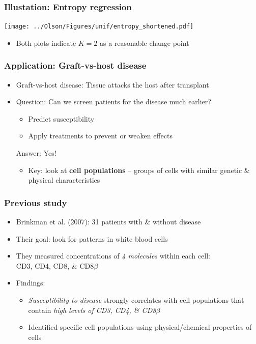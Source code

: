 \documentclass[mathserif,compress]{beamer}
\renewcommand\;{\,}
\begin{document}
\begin{frame}\frametitle{Illustation: Entropy regression}
\begin{center}
\texttt{[image: ../Olson/Figures/unif/entropy\_shortened.pdf]}
\end{center}
\begin{itemize}
\item
Both plots indicate $K = 2$ as a reasonable change point
\end{itemize}

\end{frame}

\begin{frame}\frametitle{Application: Graft-vs-host disease}
\begin{itemize}
\item[]
\alert{Graft-vs-host disease:} Tissue attacks the host after transplant
\bigskip
\item[]
\alert{Question:} Can we screen patients for the disease much earlier?
\begin{itemize}
\item
Predict susceptibility
\bigskip
\item
Apply treatments to prevent or weaken effects
\end{itemize}
\bigskip
\alert{Answer}: Yes!
\bigskip
\begin{itemize}
\item
Key: look at \textbf{cell populations} -- groups of cells with similar genetic \& physical characteristics
\end{itemize}
\end{itemize}
\end{frame}

\begin{frame}\frametitle{Previous study}
\begin{itemize}
\item[]
\alert{Brinkman et al. (2007):} 31 patients with \& without disease
\bigskip
\item[]
\alert{Their goal:} look for patterns in white blood cells
\bigskip
\item[]
They measured concentrations of \emph{4 molecules} within each cell: \\CD3, CD4, CD8, \& CD8$\beta$
\bigskip
\item[]
\alert{Findings:}
\medskip
\begin{itemize}
\item
\emph{Susceptibility to disease} strongly correlates with cell populations that contain \emph{high levels of CD3, CD4, \& CD8$\beta$}
\bigskip
\item
Identified specific cell populations using physical/chemical properties of cells
\end{itemize}
\end{itemize}
\end{frame}
\end{document}
